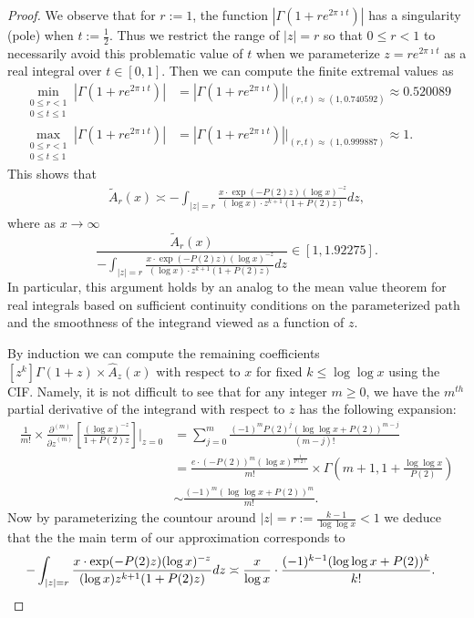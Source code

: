 \documentclass[11pt,reqno,a4letter]{article}
\numberwithin{figure}{section}
\numberwithin{table}{section}
\theoremstyle{plain}
\numberwithin{theorem}{section}
\theoremstyle{definition}
\begin{document}
\begin{proof}
We observe that for $r := 1$, the function $|\Gamma(1+re^{2\pi\imath t})|$ has a 
singularity (pole) when $t := \frac{1}{2}$. Thus we restrict the range of $|z| = r$ 
so that $0 \leq r < 1$ to necessarily avoid this problematic value of $t$ when 
we parameterize $z = r e^{2\pi\imath t}$ as a real integral over $t \in [0, 1]$. 
Then we can compute the finite extremal values as 
\begin{align*} 
\min\limits_{\substack{0 \leq r < 1 \\ 0 \leq t \leq 1}} |\Gamma(1+re^{2\pi\imath t})| & = 
     |\Gamma(1+re^{2\pi\imath t})| \Biggr\rvert_{(r,t) \approx (1, 0.740592)} \approx 
     0.520089 \\ 
\max\limits_{\substack{0 \leq r < 1 \\ 0 \leq t \leq 1}} |\Gamma(1+re^{2\pi\imath t})| & = 
     |\Gamma(1+re^{2\pi\imath t})| \Biggr\rvert_{(r,t) \approx (1, 0.999887)} \approx 1. 
\end{align*} 
This shows that 
\begin{align} 
\label{eqn_WideTildeArx_CountourIntDef_v2} 
\widetilde{A}_r(x) \asymp 
     -\int_{|z|=r} \frac{x \cdot \exp(-P(2) z) (\log x)^{-z}}{(\log x) \cdot 
     z^{k+1} (1 + P(2) z)} dz, 
\end{align} 
where as $x \rightarrow \infty$ 
\[
\frac{\widetilde{A}_r(x)}{-\int_{|z|=r} \frac{x \cdot \exp(-P(2) z) (\log x)^{-z}}{(\log x) \cdot 
     z^{k+1} (1 + P(2) z)} dz} \in [1, 1.92275]. 
\] 
In particular, this argument holds by an analog to the mean value theorem for real integrals 
based on sufficient continuity conditions on the parameterized path and the 
smoothness of the integrand viewed as a function of $z$.  

By induction we can compute the remaining coefficients 
$[z^k] \Gamma(1+z) \times \widehat{A}_z(x)$ with respect to 
$x$ for fixed $k \leq \log\log x$ using the CIF. 
Namely, it is not difficult to see that for any integer $m \geq 0$, 
we have the $m^{th}$ partial derivative of the integrand with respect to $z$ 
has the following expansion: 
\begin{align*} 
\frac{1}{m!} \times \frac{\partial^{(m)}}{{\partial z}^{(m)}}\left[ 
     \frac{(\log x)^{-z}}{1 + P(2) z}\right] \Biggr\rvert_{z=0} & = 
     \sum_{j=0}^{m} \frac{(-1)^{m} P(2)^{j} (\log\log x + P(2))^{m-j}}{(m-j)!} \\ 
     & = 
     \frac{e \cdot (-P(2))^{m} (\log x)^{\frac{1}{P(2)}}}{m!} \times 
     \Gamma\left(m+1, 1 + \frac{\log\log x}{P(2)}\right) \\ 
     & \sim \frac{(-1)^m (\log\log x + P(2))^{m}}{m!}. 
\end{align*} 
Now by parameterizing the countour around $|z| = r := \frac{k-1}{\log\log x} < 1$ we 
deduce that the the main term of our approximation corresponds to 
\begin{align*} 
-\int_{|z|=r} \frac{x \cdot \exp(-P(2) z) (\log x)^{-z}}{(\log x) z^{k+1} (1 + P(2) z)} dz & \asymp 
     \frac{x}{\log x} \cdot \frac{(-1)^{k-1} (\log\log x + P(2))^{k}}{k!}. 
     \qedhere 
\end{align*} 
\end{proof} 
\end{document}
